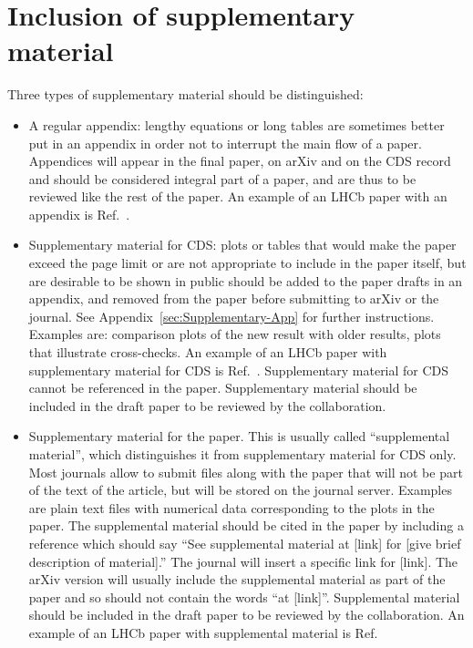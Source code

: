 \section{Inclusion of supplementary material}
\label{sec:Supplementary}

Three types of supplementary material should be distinguished:
\begin{itemize}
\item{A regular appendix: lengthy equations or long tables are sometimes
better put in an appendix in order not to interrupt the main flow of a paper.
Appendices will appear in the final paper, on arXiv
and on the CDS record and should be considered integral
part of a paper, and are thus to be reviewed like the rest of the paper.
An example of an LHCb paper with an appendix is Ref.~\cite{LHCb-PAPER-2013-070}.
}
\item{Supplementary material for CDS: plots or tables that 
would make the paper exceed the page limit or are
not appropriate to include in the paper itself,
but are desirable to be shown in public
should be added to the paper drafts in an appendix, and
removed from the paper before submitting to arXiv or the journal.
See Appendix~\ref{sec:Supplementary-App} for further instructions.
Examples are: comparison plots of the new result with older results,
plots that illustrate cross-checks.
An example of an LHCb paper with supplementary material for CDS 
is Ref.~\cite{LHCb-PAPER-2013-035}.
Supplementary material for CDS cannot be referenced in the paper.
Supplementary material should be included in the draft paper to be
reviewed by the collaboration.
}
\item{Supplementary material for the paper. This is usually called ``supplemental material'', which distinguishes it from supplementary material for CDS only. Most journals allow
to submit files along with the paper that will not be part of the
text of the article, but will be stored on the journal server.
Examples are plain text files with numerical data corresponding to the plots
in the paper. 
The supplemental material should be cited in the paper by including a reference
which should say ``See supplemental material at [link] for [give brief description of material].''
The journal will insert a specific link for [link]. The arXiv version will usually include the supplemental material as part of the paper and so should not contain the words ``at [link]''.
Supplemental material should be included in the draft paper to be
reviewed by the collaboration.
An example of an LHCb paper with supplemental material 
is Ref.~\cite{LHCb-PAPER-2015-029}
}
\end{itemize}

